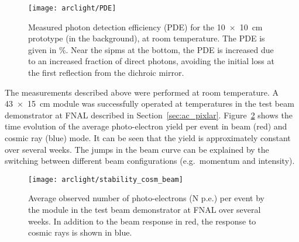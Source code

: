 \begin{figure}[htb]
	\centering
	\texttt{[image: arclight/PDE]}
	\caption{Measured photon detection efficiency (PDE) for the \SI{10 x 10}{\centi\metre} \AL{} prototype (in the background), at room temperature.
		The PDE is given in \si{\percent}.
		Near the \glspl{sipm} at the bottom, the PDE is increased due to an increased fraction of direct photons, avoiding the initial loss at the first reflection from the dichroic mirror.}
	\label{fig:arclight_pde}
\end{figure}

The measurements described above were performed at room temperature.
A \SI{43 x 15}{\centi\metre} \AL{} module was successfully operated at \lar{} temperatures in the \pixlar{} test beam demonstrator at FNAL described in Section~\ref{sec:ac_pixlar}.
Figure~\ref{fig:arclight_pixlar} shows the time evolution of the average photo-electron yield per event in beam (red) and cosmic ray (blue) mode.
It can be seen that the yield is approximately constant over several weeks.
The jumps in the beam curve can be explained by the switching between different beam configurations (e.g.\ momentum and intensity).


\begin{figure}[htb]
	\centering
	\texttt{[image: arclight/stability\_cosm\_beam]}
	\caption{Average observed number of photo-electrons (N p.e.) per event by the \AL{} module in the \pixlar{} test beam demonstrator at FNAL over several weeks.
		In addition to the beam response in red, the response to cosmic rays is shown in blue.}
	\label{fig:arclight_pixlar}
\end{figure}